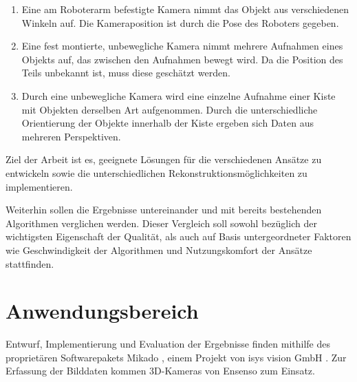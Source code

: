 \begin{enumerate}
\item Eine am Roboterarm befestigte Kamera nimmt das Objekt aus verschiedenen Winkeln auf.
Die Kameraposition ist durch die Pose des Roboters gegeben.
\item Eine fest montierte, unbewegliche Kamera nimmt mehrere Aufnahmen eines Objekts auf, das zwischen den Aufnahmen bewegt wird.
Da die Position des Teils unbekannt ist, muss diese geschätzt werden.
\item Durch eine unbewegliche Kamera wird eine einzelne Aufnahme einer Kiste mit Objekten derselben Art aufgenommen.
Durch die unterschiedliche Orientierung der Objekte innerhalb der Kiste ergeben sich Daten aus mehreren Perspektiven.
\end{enumerate}

Ziel der Arbeit ist es, geeignete Lösungen für die verschiedenen Ansätze zu entwickeln sowie die unterschiedlichen Rekonstruktionsmöglichkeiten zu implementieren.

Weiterhin sollen die Ergebnisse untereinander und mit bereits bestehenden Algorithmen verglichen werden.
Dieser Vergleich soll sowohl bezüglich der wichtigsten Eigenschaft der Qualität, als auch auf Basis untergeordneter Faktoren wie Geschwindigkeit der Algorithmen und Nutzungskomfort der Ansätze stattfinden.



\section{Anwendungsbereich}
\label{sec:anwendungsbereich}

Entwurf, Implementierung und Evaluation der Ergebnisse finden mithilfe des proprietären Softwarepakets Mikado \cite{mikadoWebsite}, einem Projekt von isys vision GmbH \cite{isysWebsite}.
Zur Erfassung der Bilddaten kommen 3D-Kameras von Ensenso \cite{ensensoWebsite} zum Einsatz.
